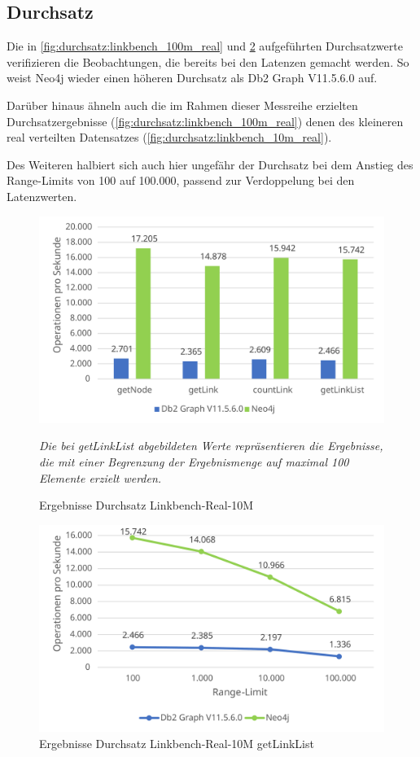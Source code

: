\subsection{Durchsatz}
Die in \autoref{fig:durchsatz:linkbench_100m_real} und \ref{fig:durchsatz:linkbench_100m_real:rl} aufgeführten Durchsatzwerte verifizieren die Beobachtungen, die bereits bei den Latenzen gemacht werden. So weist Neo4j wieder einen höheren Durchsatz als Db2 Graph V11.5.6.0 auf.

Darüber hinaus ähneln auch die im Rahmen dieser Messreihe erzielten Durchsatzergebnisse (\autoref{fig:durchsatz:linkbench_100m_real}) denen des kleineren real verteilten Datensatzes (\autoref{fig:durchsatz:linkbench_10m_real}).

Des Weiteren halbiert sich auch hier ungefähr der Durchsatz bei dem Anstieg des Range-Limits von 100 auf 100.000, passend zur Verdoppelung bei den Latenzwerten.

\begin{figure}[!ht]
    \centering
    \includegraphics[width=\textwidth]{images/diagramme/linkbench_100m_real_durchsatz.pdf}
    \caption{Ergebnisse Durchsatz Linkbench-Real-10M}
    \label{fig:durchsatz:linkbench_100m_real}
    \vspace{1em}
    \textit{Die bei getLinkList abgebildeten Werte repräsentieren die Ergebnisse, die mit einer Begrenzung der Ergebnismenge auf maximal 100 Elemente erzielt werden.}
\end{figure}

\begin{figure}[!ht]
    \centering
    \includegraphics[width=\textwidth]{images/diagramme/limit_absolute_durchsatz_real_100m.pdf}
    \caption{Ergebnisse Durchsatz Linkbench-Real-10M getLinkList}
    \label{fig:durchsatz:linkbench_100m_real:rl}
\end{figure}